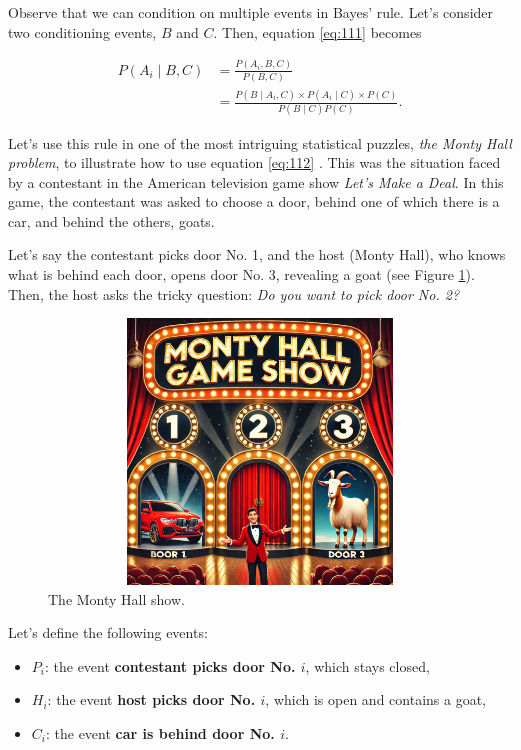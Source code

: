 Observe that we can condition on multiple events in Bayes' rule. Let's consider two conditioning events, \( B \) and \( C \). Then, equation \ref{eq:111} becomes

\begin{align}
	P(A_i\mid B,C)&=\frac{P(A_i,B,C)}{P(B,C)}\nonumber\\
	&=\frac{P(B\mid A_i,C) \times P(A_i\mid C) \times P(C)}{P(B\mid C)P(C)}.
	\label{eq:112}
\end{align}

Let's use this rule in one of the most intriguing statistical puzzles, \textit{the Monty Hall problem}, to illustrate how to use equation \ref{eq:112} \cite{selvin1975problem,Dawid2016}. This was the situation faced by a contestant in the American television game show \textit{Let's Make a Deal}. In this game, the contestant was asked to choose a door, behind one of which there is a car, and behind the others, goats. 

Let's say the contestant picks door No. 1, and the host (Monty Hall), who knows what is behind each door, opens door No. 3, revealing a goat (see Figure \ref{fig11}). Then, the host asks the tricky question: \textit{Do you want to pick door No. 2?}


\begin{figure}
	\includegraphics[width=340pt, height=200pt]{Chapters/chapter1/figures/MHproblemNew.png}
	\caption[List of figure caption goes here]{The Monty Hall show.}\label{fig11}
\end{figure}

Let's define the following events: 

\begin{itemize}
	\item \( P_i \): the event \textbf{contestant picks door No. \( i \)}, which stays closed, 
	\item \( H_i \): the event \textbf{host picks door No. \( i \)}, which is open and contains a goat, 
	\item \( C_i \): the event \textbf{car is behind door No. \( i \)}.
\end{itemize}

